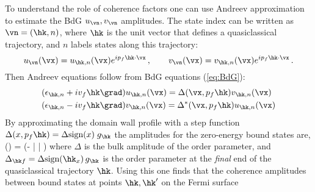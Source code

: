 \documentclass[prb,aps,showpacs,amsmath,twocolumn,10pt]{revtex4-1}
\newcommand{\sign}{\mbox{sign}}
\begin{document}
To understand the role of coherence factors one can use Andreev approximation to estimate the BdG
$u_\vn,v_\vn$ amplitudes. 
The state index can be written as $\vn=(\hk,n)$, where $\hk$ is the unit vector that defines a quasiclassical
trajectory, and $n$ labels states along this trajectory:
$$
u_\vn(\vx) = u_{\hk,n}(\vx) e^{ip_f \hk \cdot \vx}  \,,
\qquad
v_\vn(\vx) = v_{\hk,n}(\vx) e^{ip_f \hk \cdot \vx}  \,.
$$
Then Andreev equations follow from BdG equations (\ref{eq:BdG}): 
\begin{align}
\begin{split}
& (\epsilon_{\hk,n} + iv_f \hk\grad) u_{\hk,n}(\vx) = \Delta(\vx,p_f\hk) v_{\hk,n}(\vx) 
\\
& (\epsilon_{\hk,n} - iv_f \hk\grad) v_{\hk,n}(\vx) = \Delta^*(\vx,p_f\hk) u_{\hk,n}(\vx) 
\end{split}
\label{eq:Andreev}
\end{align}
By approximating the domain wall profile with a step function 
$\Delta(x, p_f \hk) = \Delta \sign(x) \; g_{\hk}$
the amplitudes for the zero-energy bound states are, 
\be
\label{eq:uv_andreev}
\left[ \begin{array}{c}
u_{\hk,n} \\ v_{\hk,n}
\end{array} \right] (\vx)
=  
\left[ \begin{array}{c}
1  \\ -i \; \sign(\Delta^*_{\hk f}) 
\end{array} \right] 
\exp\left(- \left|  \right| \right)
\ee
where $\Delta$ is the bulk amplitude of the order parameter, %
and $\Delta_{\hk f} = \Delta \sign(\hk_x) \, g_{\hk}$ 
is the order parameter at the \emph{final} end of the quasiclassical trajectory $\hk$. 
Using this one finds that the coherence amplitudes
between bound states at points $\hk, \hk'$ on the Fermi surface 
\end{document}
